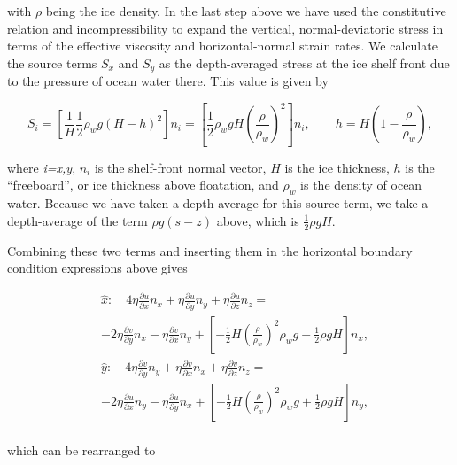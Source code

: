 with \textit{\(\rho{}\)} being the ice density. In the last step above we have used the constitutive relation and incompressibility to expand the vertical, normal-deviatoric stress in terms of the effective viscosity and horizontal-normal strain rates. We calculate the source terms $S_x$ and $S_y$ as the depth-averaged stress at the ice shelf front due to the pressure of ocean water there. This value is given by

\begin{equation}
S_{i}=\left[ \frac{1}{H}\frac{1}{2}\rho _{w}g\left( H-h \right)^{2} \right]n_{i}=\left[ \frac{1}{2}\rho _{w}gH\left( \frac{\rho }{\rho _{w}} \right)^{2} \right]n_{i},\quad \quad h=H\left( 1-\frac{\rho _{{}}}{\rho _{w}} \right),
\end{equation}

where  \textit{i=x,y}, $n_i$ is the shelf-front normal vector, $H$ is the ice thickness, $h$ is the ``freeboard'', or ice thickness above floatation, and $\rho_w$ is the density of ocean water. Because we have taken a depth-average for this source term, we take a depth-average of the term $\rho g\left( s-z \right)$ above, which is $\frac{1}{2}\rho gH$.

Combining these two terms and inserting them in the horizontal boundary condition expressions above gives

\begin{equation}
\begin{split}
& \hat{x}:\quad 4\eta \frac{\partial u}{\partial x}n_{x}+\eta \frac{\partial u}{\partial y}n_{y}+\eta \frac{\partial u}{\partial z}n_{z}= \\
& -2\eta \frac{\partial v}{\partial y}n_{x}-\eta \frac{\partial v}{\partial x}n_{y}+\left[ -\frac{1}{2}H\left( \frac{\rho }{\rho _{w}} \right)^{2}\rho _{w}g+\frac{1}{2}\rho gH \right]n_{x}, \\ 
 & \hat{y}:\quad 4\eta \frac{\partial v}{\partial y}n_{y}+\eta \frac{\partial v}{\partial x}n_{x}+\eta \frac{\partial v}{\partial z}n_{z}= \\
 & -2\eta \frac{\partial u}{\partial x}n_{y}-\eta \frac{\partial u}{\partial y}n_{x}+\left[ -\frac{1}{2}H\left( \frac{\rho }{\rho _{w}} \right)^{2}\rho _{w}g+\frac{1}{2}\rho gH \right]n_{y}, \\ 
\end{split}
\end{equation}

which can be rearranged to

